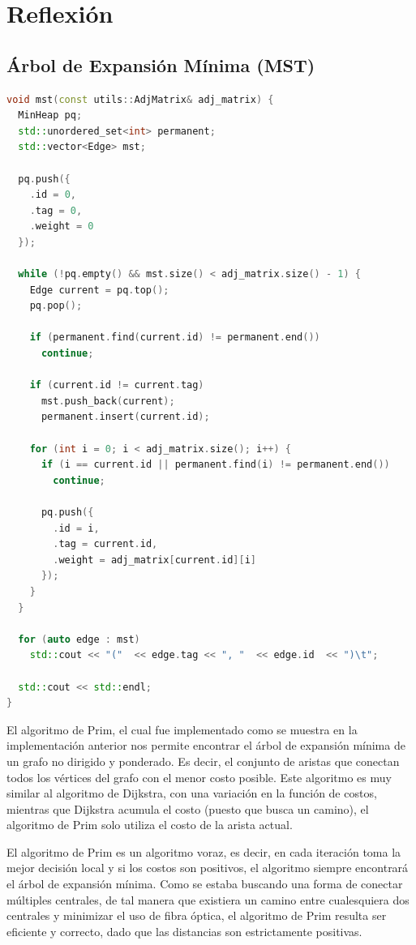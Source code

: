 \documentclass[12pt]{article}
\begin{document}
  \section{Reflexión}
  \subsection{Árbol de Expansión Mínima (MST)}

  \begin{lstlisting}[language=cpp, caption={Algoritmo de Prim}, label={lst:prim}]
void mst(const utils::AdjMatrix& adj_matrix) {
  MinHeap pq;
  std::unordered_set<int> permanent;
  std::vector<Edge> mst;

  pq.push({
    .id = 0,
    .tag = 0,
    .weight = 0
  });

  while (!pq.empty() && mst.size() < adj_matrix.size() - 1) {
    Edge current = pq.top();
    pq.pop();

    if (permanent.find(current.id) != permanent.end())
      continue;

    if (current.id != current.tag)
      mst.push_back(current);
      permanent.insert(current.id);

    for (int i = 0; i < adj_matrix.size(); i++) {
      if (i == current.id || permanent.find(i) != permanent.end())
        continue;

      pq.push({
        .id = i,
        .tag = current.id,
        .weight = adj_matrix[current.id][i]
      });
    }
  }

  for (auto edge : mst)
    std::cout << "("  << edge.tag << ", "  << edge.id  << ")\t";

  std::cout << std::endl;
}
  \end{lstlisting}

  El algoritmo de Prim, el cual fue implementado como se muestra en la implementación anterior
  nos permite encontrar el árbol de expansión mínima de un grafo no dirigido y ponderado.
  Es decir, el conjunto de aristas que conectan todos los vértices del grafo con el menor
  costo posible. Este algoritmo es muy similar al algoritmo de Dijkstra, con una variación 
  en la función de costos, mientras que Dijkstra acumula el costo (puesto que busca un camino),
  el algoritmo de Prim solo utiliza el costo de la arista actual.
  
  El algoritmo de Prim es un algoritmo voraz, es decir, en cada iteración toma la mejor decisión
  local y si los costos son positivos, el algoritmo siempre encontrará el árbol de expansión mínima.
  Como se estaba buscando una forma de conectar múltiples centrales, de tal manera que existiera un camino
  entre cualesquiera dos centrales y minimizar el uso de fibra óptica, el algoritmo de Prim resulta ser
  eficiente y correcto, dado que las distancias son estrictamente positivas.
\end{document}
